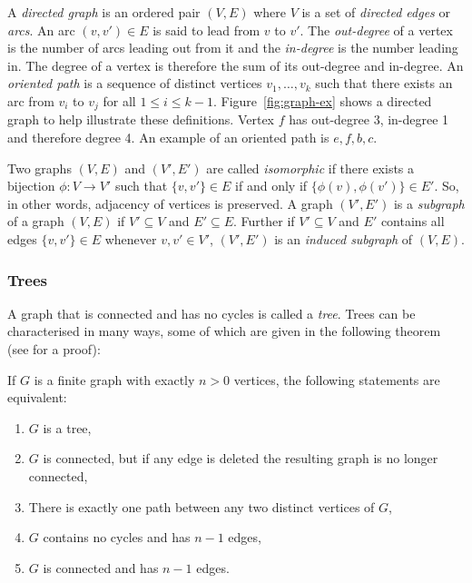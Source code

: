 A \textit{directed graph} is an ordered pair $(V,E)$ where $V$ is a set of
\textit{directed edges} or \textit{arcs}.  An arc $(v,v') \in E$ is said to
lead from $v$ to $v'$.  The \textit{out-degree} of a vertex is the number of
arcs leading out from it and the \textit{in-degree} is the number leading in.
The degree of a vertex is therefore the sum of its out-degree and in-degree.
An \textit{oriented path} is a sequence of distinct vertices $v_1,\dotsc,v_k$
such that there exists an arc from $v_i$ to $v_j$ for all $1 \leq i \leq k-1$.
Figure~\ref{fig:graph-ex} shows a directed graph to help illustrate these
definitions.  Vertex $f$ has out-degree 3, in-degree 1 and therefore degree 4.
An example of an oriented path is $e,f,b,c$.

Two graphs $(V,E)$ and $(V',E')$ are called \textit{isomorphic} if there
exists a bijection $\phi \colon V \to V'$ such that $\{v,v'\} \in E$ if and
only if $\{\phi(v),\phi(v')\} \in E'$.  So, in other words, adjacency of
vertices is preserved.  A graph $(V',E')$ is a \textit{subgraph} of a graph
$(V,E)$ if $V' \subseteq V$ and $E' \subseteq E$.  Further if $V' \subseteq V$
and $E'$ contains all edges $\{v,v'\} \in E$ whenever $v,v' \in V'$, $(V',E')$
is an \textit{induced subgraph} of $(V,E)$.

\subsubsection{Trees}
\label{sec:trees}

A graph that is connected and has no cycles is called a \textit{tree}.  Trees can be
characterised in many ways, some of which are given in the following theorem
(see \citep[][Section 2.3.4.1]{knuth97taocp1} for a proof):

\begin{thm}
  If $G$ is a finite graph with exactly $n > 0$ vertices, the following
  statements are equivalent:
  \begin{enumerate}[label=\alph*)]
  \item $G$ is a tree,
  \item $G$ is connected, but if any edge is deleted the resulting graph is no
    longer connected,
  \item There is exactly one path between any two distinct vertices of $G$,
  \item $G$ contains no cycles and has $n-1$ edges,
  \item $G$ is connected and has $n-1$ edges.
  \end{enumerate}
\end{thm}

